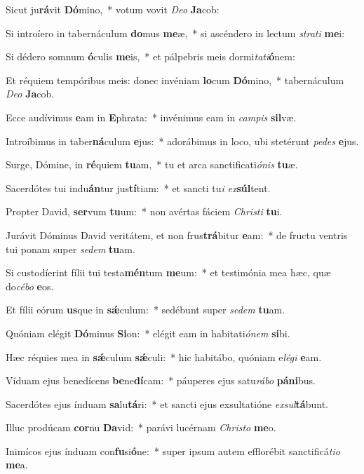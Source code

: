 \item Sicut ju\textbf{rá}vit \textbf{Dó}mino,~* votum vovit \textit{De}\textit{o} \textbf{Ja}cob:
\item Si introíero in tabernáculum \textbf{do}mus \textbf{me}æ,~* si ascéndero in lectum \textit{stra}\textit{ti} \textbf{me}i:
\item Si dédero somnum \textbf{ó}culis \textbf{me}is,~* et pálpebris meis dormi\textit{ta}\textit{ti}\textbf{ó}nem:
\item Et réquiem tempóribus meis: donec invéniam \textbf{lo}cum \textbf{Dó}mino,~* tabernáculum \textit{De}\textit{o} \textbf{Ja}cob.
\item Ecce audívimus \textbf{e}am in \textbf{E}phrata:~* invénimus eam in \textit{cam}\textit{pis} \textbf{sil}væ.
\item Introíbimus in taber\textbf{ná}culum \textbf{e}jus:~* adorábimus in loco, ubi stetérunt \textit{pe}\textit{des} \textbf{e}jus.
\item Surge, Dómine, in \textbf{ré}quiem \textbf{tu}am,~* tu et arca sanctificati\textit{ó}\textit{nis} \textbf{tu}æ.
\item Sacerdótes tui indu\textbf{án}tur jus\textbf{tí}tiam:~* et sancti tu\textit{i} \textit{ex}\textbf{súl}tent.
\item Propter David, \textbf{ser}vum \textbf{tu}um:~* non avértas fáciem \textit{Chris}\textit{ti} \textbf{tu}i.
\item Jurávit Dóminus David veritátem, et non frus\textbf{trá}bitur \textbf{e}am:~* de fructu ventris tui ponam super \textit{se}\textit{dem} \textbf{tu}am.
\item Si custodíerint fílii tui testa\textbf{mén}tum \textbf{me}um:~* et testimónia mea hæc, quæ do\textit{cé}\textit{bo} \textbf{e}os.
\item Et fílii eórum \textbf{us}que in \textbf{sǽ}culum:~* sedébunt super \textit{se}\textit{dem} \textbf{tu}am.
\item Quóniam elégit \textbf{Dó}minus \textbf{Si}on:~* elégit eam in habitati\textit{ó}\textit{nem} \textbf{si}bi.
\item Hæc réquies mea in \textbf{sǽ}culum \textbf{sǽ}culi:~* hic habitábo, quóniam e\textit{lé}\textit{gi} \textbf{e}am.
\item Víduam ejus benedícens \textbf{be}ne\textbf{dí}cam:~* páuperes ejus satu\textit{rá}\textit{bo} \textbf{pá}\textbf{ni}bus.
\item Sacerdótes ejus índuam \textbf{sa}lu\textbf{tá}ri:~* et sancti ejus exsultatióne \textit{ex}\textit{sul}\textbf{tá}bunt.
\item Illuc prodúcam \textbf{cor}nu \textbf{Da}vid:~* parávi lucérnam \textit{Chris}\textit{to} \textbf{me}o.
\item Inimícos ejus índuam con\textbf{fu}si\textbf{ó}ne:~* super ipsum autem efflorébit sanctificá\textit{ti}\textit{o} \textbf{me}a.
